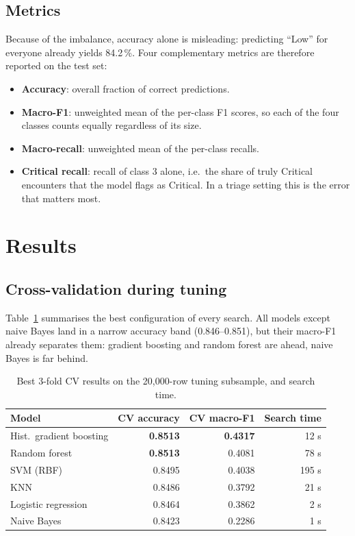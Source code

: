 \documentclass[11pt,a4paper]{article}
\newcommand{\best}[1]{\textbf{\textcolor{accent}{#1}}}
\newcommand{\sect}[1]{\section{#1}}
\begin{document}
\subsection{Metrics}

Because of the imbalance, accuracy alone is misleading: predicting ``Low'' for everyone already
yields 84.2\,\%. Four complementary metrics are therefore reported on the test set:

\begin{itemize}[itemsep=2pt]
  \item \textbf{Accuracy}: overall fraction of correct predictions.
  \item \textbf{Macro-F1}: unweighted mean of the per-class F1 scores, so each of the four
        classes counts equally regardless of its size.
  \item \textbf{Macro-recall}: unweighted mean of the per-class recalls.
  \item \textbf{Critical recall}: recall of class 3 alone, i.e.\ the share of truly Critical
        encounters that the model flags as Critical. In a triage setting this is the error
        that matters most.
\end{itemize}

\sect{Results}

\subsection{Cross-validation during tuning}

Table~\ref{tab:cv} summarises the best configuration of every search. All models except naive
Bayes land in a narrow accuracy band (0.846--0.851), but their macro-F1 already separates them:
gradient boosting and random forest are ahead, naive Bayes is far behind.

\begin{table}[H]
\centering\small
\caption{Best 3-fold CV results on the 20{,}000-row tuning subsample, and search time.}
\label{tab:cv}
\begin{tabular}{@{}lrrr@{}}
\toprule
\textbf{Model} & \textbf{CV accuracy} & \textbf{CV macro-F1} & \textbf{Search time} \\
\midrule
Hist.\ gradient boosting & \best{0.8513} & \best{0.4317} & 12 s \\
Random forest            & \best{0.8513} & 0.4081 & 78 s \\
SVM (RBF)                & 0.8495 & 0.4038 & 195 s \\
KNN                      & 0.8486 & 0.3792 & 21 s \\
Logistic regression      & 0.8464 & 0.3862 & 2 s \\
Naive Bayes              & 0.8423 & 0.2286 & 1 s \\
\bottomrule
\end{tabular}
\end{table}
\end{document}
